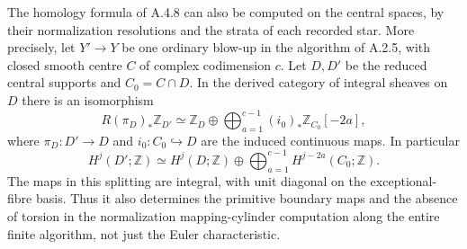 \begin{proposition}\label{push:A49}
The homology formula of A.4.8 can also be computed
on the central spaces, by their normalization
resolutions and the strata of each recorded star.
More precisely, let $Y'\to Y$ be one ordinary
blow-up in the algorithm of A.2.5, with closed
smooth centre $C$ of complex codimension $c$.
Let $D,D'$ be the reduced central supports and
$C_0=C\cap D$. In the derived category of integral
sheaves on $D$ there is an isomorphism
\[
 R(\pi_D)_*\mathbb Z_{D'}\simeq
 \mathbb Z_D\oplus
 \bigoplus_{a=1}^{c-1}(i_0)_*\mathbb Z_{C_0}[-2a],
 \tag{A.49a}
\]
where $\pi_D:D'\to D$ and $i_0:C_0\hookrightarrow D$
are the induced continuous maps. In particular
\[
 H^j(D';\mathbb Z)\simeq H^j(D;\mathbb Z)
 \oplus\bigoplus_{a=1}^{c-1}H^{j-2a}(C_0;\mathbb Z).
 \tag{A.49b}
\]
The maps in this splitting are integral, with unit
diagonal on the exceptional-fibre basis. Thus it
also determines the primitive boundary maps and
the absence of torsion in the normalization
mapping-cylinder computation along the entire
finite algorithm, not just the Euler characteristic.
\end{proposition}
